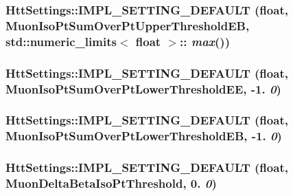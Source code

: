 \label{classHttSettings_adee678dc804dcbbe8fcf8a8bb1522c66}
\hypertarget{classHttSettings_ac14bc12887f53356e62898136bd2e65b}{
\subsubsection[{IMPL\_\-SETTING\_\-DEFAULT}]{\setlength{\rightskip}{0pt plus 5cm}HttSettings::IMPL\_\-SETTING\_\-DEFAULT (float, \/  MuonIsoPtSumOverPtUpperThresholdEB, \/  std::numeric\_\-limits$<$ float $>$:: {\em max}())}}
\label{classHttSettings_ac14bc12887f53356e62898136bd2e65b}
\hypertarget{classHttSettings_a7758be711fa73d2ae7f189cc3d756a50}{
\subsubsection[{IMPL\_\-SETTING\_\-DEFAULT}]{\setlength{\rightskip}{0pt plus 5cm}HttSettings::IMPL\_\-SETTING\_\-DEFAULT (float, \/  MuonIsoPtSumOverPtLowerThresholdEE, \/  -\/1. {\em 0})}}
\label{classHttSettings_a7758be711fa73d2ae7f189cc3d756a50}
\hypertarget{classHttSettings_a7f40ee4aa5036838cfa60ece75e7bf8e}{
\subsubsection[{IMPL\_\-SETTING\_\-DEFAULT}]{\setlength{\rightskip}{0pt plus 5cm}HttSettings::IMPL\_\-SETTING\_\-DEFAULT (float, \/  MuonIsoPtSumOverPtLowerThresholdEB, \/  -\/1. {\em 0})}}
\label{classHttSettings_a7f40ee4aa5036838cfa60ece75e7bf8e}
\hypertarget{classHttSettings_a8001c74f4fbc97854d11ac2ef6cb62b7}{
\subsubsection[{IMPL\_\-SETTING\_\-DEFAULT}]{\setlength{\rightskip}{0pt plus 5cm}HttSettings::IMPL\_\-SETTING\_\-DEFAULT (float, \/  MuonDeltaBetaIsoPtThreshold, \/  0. {\em 0})}}

